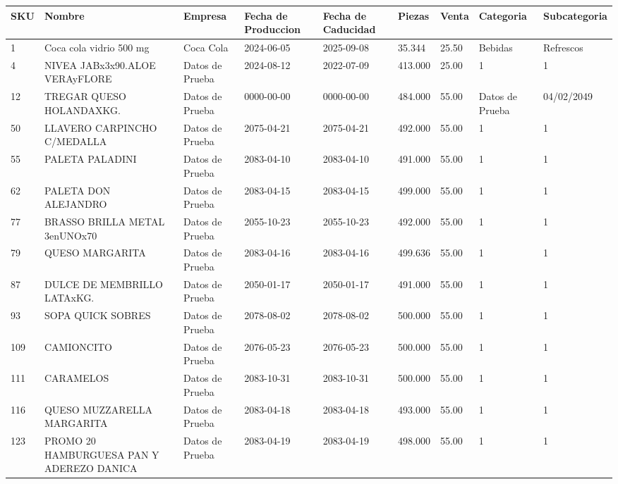 \documentclass[a4paper,12pt]{article}
\begin{document}
\footnotesize  
\setlength\LTleft{-50pt} 
\setlength\LTright{-100pt}  
\begin{landscape} 
\thispagestyle{empty}
\begin{longtable}{|p{4cm}|p{2.5cm}|p{2.5cm}|p{1.8cm}|p{1.8cm}|p{1cm}|p{1cm}|p{3cm}|p{3cm}||}
\hline 
\hline
\textbf{SKU} & \textbf{Nombre} & \textbf{Empresa} & \textbf{Fecha de Produccion} & \textbf{Fecha de Caducidad} & \textbf{Piezas} & \textbf{Venta} & \textbf{Categoria} & \textbf{Subcategoria}\\ \hline \hline1 & Coca cola vidrio 500 mg  & Coca Cola & 2024-06-05 & 2025-09-08 & 35.344 & 25.50 & Bebidas & Refrescos \\ \hline 
4 & NIVEA JABx3x90.ALOE VERAyFLORE & Datos de Prueba & 2024-08-12 & 2022-07-09 & 413.000 & 25.00 & 1 & 1 \\ \hline 
12 & TREGAR QUESO HOLANDAXKG. & Datos de Prueba & 0000-00-00 & 0000-00-00 & 484.000 & 55.00 & Datos de Prueba & 04/02/2049 \\ \hline 
50 & LLAVERO CARPINCHO C/MEDALLA & Datos de Prueba & 2075-04-21 & 2075-04-21 & 492.000 & 55.00 & 1 & 1 \\ \hline 
55 & PALETA PALADINI & Datos de Prueba & 2083-04-10 & 2083-04-10 & 491.000 & 55.00 & 1 & 1 \\ \hline 
62 & PALETA DON ALEJANDRO & Datos de Prueba & 2083-04-15 & 2083-04-15 & 499.000 & 55.00 & 1 & 1 \\ \hline 
77 & BRASSO BRILLA METAL 3enUNOx70 & Datos de Prueba & 2055-10-23 & 2055-10-23 & 492.000 & 55.00 & 1 & 1 \\ \hline 
79 & QUESO MARGARITA & Datos de Prueba & 2083-04-16 & 2083-04-16 & 499.636 & 55.00 & 1 & 1 \\ \hline 
87 & DULCE DE MEMBRILLO LATAxKG. & Datos de Prueba & 2050-01-17 & 2050-01-17 & 491.000 & 55.00 & 1 & 1 \\ \hline 
93 & SOPA QUICK SOBRES & Datos de Prueba & 2078-08-02 & 2078-08-02 & 500.000 & 55.00 & 1 & 1 \\ \hline 
109 & CAMIONCITO & Datos de Prueba & 2076-05-23 & 2076-05-23 & 500.000 & 55.00 & 1 & 1 \\ \hline 
111 & CARAMELOS & Datos de Prueba & 2083-10-31 & 2083-10-31 & 500.000 & 55.00 & 1 & 1 \\ \hline 
116 & QUESO MUZZARELLA MARGARITA & Datos de Prueba & 2083-04-18 & 2083-04-18 & 493.000 & 55.00 & 1 & 1 \\ \hline 
123 & PROMO 20 HAMBURGUESA  PAN Y ADEREZO DANICA & Datos de Prueba & 2083-04-19 & 2083-04-19 & 498.000 & 55.00 & 1 & 1 \\ \hline 

\end{longtable}
\end{landscape}
\end{document}
